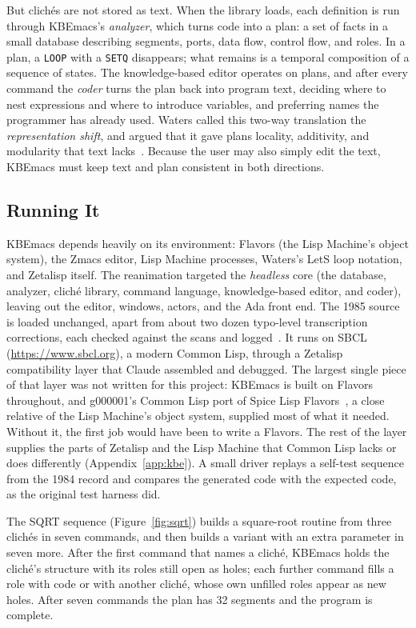 \documentclass[11pt]{article}
\begin{document}
But clich\'es are not stored as text. When the library loads, each
definition is run through KBEmacs's \emph{analyzer}, which turns code
into a plan: a set of facts in a small database describing segments,
ports, data flow, control flow, and roles. In a plan, a
\texttt{LOOP} with a \texttt{SETQ} disappears; what remains is a
temporal composition of a sequence of states. The knowledge-based editor
operates on plans, and after every command the \emph{coder} turns the
plan back into program text, deciding where to nest expressions and
where to introduce variables, and preferring names the programmer has
already used. Waters called this two-way translation the
\emph{representation shift}, and argued that it gave plans locality,
additivity, and modularity that text lacks~\cite{waters1986aimag}.
Because the user may also simply edit the text, KBEmacs must keep text
and plan consistent in both directions.

\subsection{Running It}

KBEmacs depends heavily on its environment: Flavors (the Lisp Machine's
object system), the Zmacs editor, Lisp Machine processes, Waters's LetS
loop notation, and Zetalisp itself. The reanimation targeted the
\emph{headless} core (the database, analyzer, clich\'e library,
command language, knowledge-based editor, and coder), leaving out the
editor, windows, actors, and the Ada front end. The 1985 source is
loaded unchanged, apart from about two dozen typo-level transcription
corrections, each checked against the scans and
logged~\cite{kbemacsrepo}. It runs on SBCL (\url{https://www.sbcl.org}),
a modern Common Lisp, through a Zetalisp compatibility layer that Claude
assembled and debugged. The largest single piece of that layer was not
written for this project: KBEmacs is built on Flavors throughout, and
g000001's Common Lisp port of Spice Lisp Flavors~\cite{g000001}, a close
relative of the Lisp Machine's object system, supplied most of what it
needed. Without it, the first job would have been to write a Flavors.
The rest of the layer supplies the parts of Zetalisp and the Lisp
Machine that Common Lisp lacks or does differently
(Appendix~\ref{app:kbe}). A small driver replays a self-test sequence
from the 1984 record and compares the generated code with the expected
code, as the original test harness did.

The SQRT sequence (Figure~\ref{fig:sqrt}) builds a square-root routine
from three clich\'es in seven commands, and then builds a variant with
an extra parameter in seven more. After the first command that names a
clich\'e, KBEmacs holds the clich\'e's structure with its roles still
open as holes; each further command fills a role with code or with
another clich\'e, whose own unfilled roles appear as new holes. After
seven commands the plan has 32 segments and the program is complete.
\end{document}
